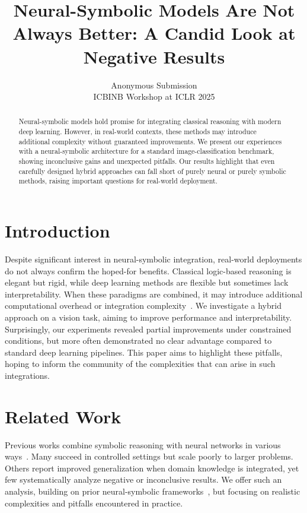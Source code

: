 \documentclass{article}
\title{Neural-Symbolic Models Are Not Always Better: A Candid Look at Negative Results}
\author{%
Anonymous Submission \\
ICBINB Workshop at ICLR 2025
}
\begin{document}
\maketitle

\begin{abstract}
Neural-symbolic models hold promise for integrating classical reasoning with modern deep learning. However, in real-world contexts, these methods may introduce additional complexity without guaranteed improvements. We present our experiences with a neural-symbolic architecture for a standard image-classification benchmark, showing inconclusive gains and unexpected pitfalls. Our results highlight that even carefully designed hybrid approaches can fall short of purely neural or purely symbolic methods, raising important questions for real-world deployment.
\end{abstract}

\section{Introduction}
Despite significant interest in neural-symbolic integration, real-world deployments do not always confirm the hoped-for benefits. Classical logic-based reasoning is elegant but rigid, while deep learning methods are flexible but sometimes lack interpretability. When these paradigms are combined, it may introduce additional computational overhead or integration complexity~\citep{goodfellow2015explaining,he2016resnet}. We investigate a hybrid approach on a vision task, aiming to improve performance and interpretability. Surprisingly, our experiments revealed partial improvements under constrained conditions, but more often demonstrated no clear advantage compared to standard deep learning pipelines. This paper aims to highlight these pitfalls, hoping to inform the community of the complexities that can arise in such integrations.

\section{Related Work}
Previous works combine symbolic reasoning with neural networks in various ways~\citep{kingma2014adam,simonyan2014very}. Many succeed in controlled settings but scale poorly to larger problems. Others report improved generalization when domain knowledge is integrated, yet few systematically analyze negative or inconclusive results. We offer such an analysis, building on prior neural-symbolic frameworks~\citep{dozat2016incorporating}, but focusing on realistic complexities and pitfalls encountered in practice.
\end{document}
